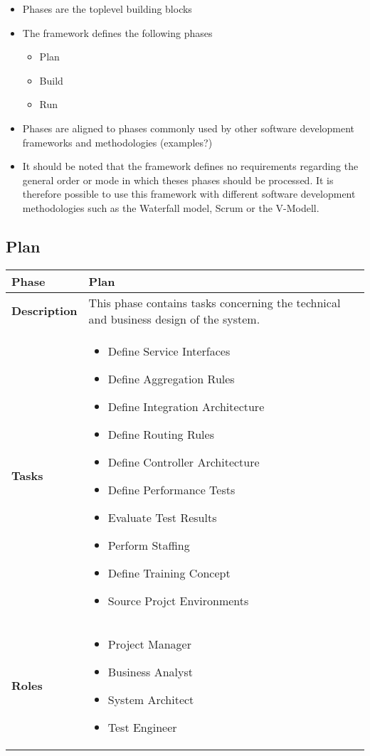 \begin{itemize}
	\item Phases are the toplevel building blocks
	\item The framework defines the following phases
	\begin{itemize}
		\item Plan
		\item Build
		\item Run
	\end{itemize}
	\item Phases are aligned to phases commonly used by other software development frameworks and methodologies (examples?)
	\item It should be noted that the framework defines no requirements regarding the general order or mode in which theses phases should be processed. It is therefore possible to use this framework with different software development methodologies such as the Waterfall model, Scrum or the V-Modell.
\end{itemize}

\subsection{Plan}
\begin{minipage}{\textwidth}
	\label{table:ch6_View_Plan}
	\begin{tabular}
		{|m{2cm}|m{10cm}|} \hline \bfseries Phase & Plan\\
		\hline \bfseries Description & This phase contains tasks concerning the technical and business design of the system.\\
		\hline \bfseries Tasks & 
		\begin{itemize}
			\item Define Service Interfaces
			\item Define Aggregation Rules
			\item Define Integration Architecture
			\item Define Routing Rules
			\item Define Controller Architecture
			\item Define Performance Tests
			\item Evaluate Test Results
			\item Perform Staffing
			\item Define Training Concept
			\item Source Projct Environments
		\end{itemize}
		\\
		\hline \bfseries Roles &
		\begin{itemize}
			\item Project Manager
			\item Business Analyst
			\item System Architect
			\item Test Engineer
		\end{itemize}
		\\
		\hline 
	\end{tabular}
\end{minipage}

